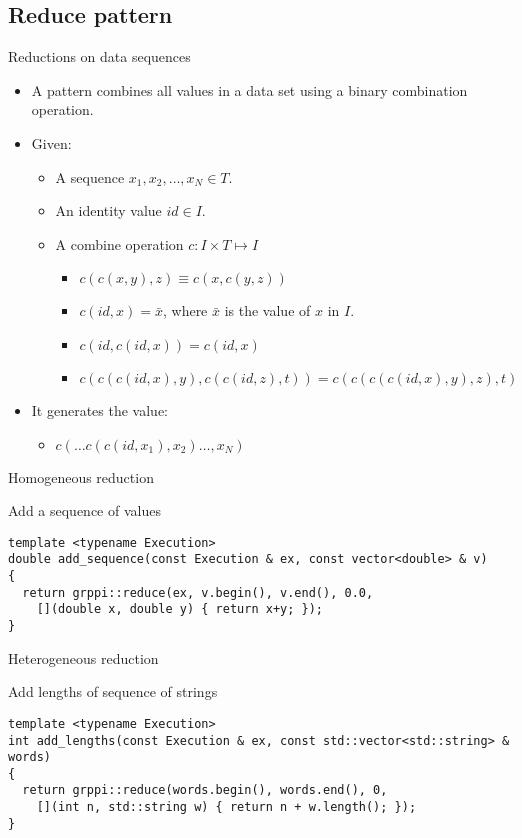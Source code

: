 \subsection{Reduce pattern}

\begin{frame}[t]{Reductions on data sequences}
\begin{itemize}
  \item A  pattern combines all values in a data set
        using a binary combination operation.
  \vfill
  \item Given:
    \begin{itemize}
      \item A sequence $x_1, x_2, \ldots, x_N \in T$.
      \item An identity value $id \in I$.
      \item A combine operation $c : I \times T \mapsto I$
        \begin{itemize}
          \item $c(c(x,y),z) \equiv c(x,c(y,z))$
          \item $c(id,x) = \bar{x}$, where $\bar{x}$ is the value of $x$ in $I$.
          \item $c(id,c(id,x)) = c(id,x)$
          \item $c(c(c(id,x),y),c(c(id,z),t)) = c(c(c(c(id,x),y),z),t)$
        \end{itemize}
    \end{itemize}
  \vfill
  \item It generates the value:
    \begin{itemize}
      \item $c(\ldots c(c(id,x_1), x_2) \ldots, x_N)$
    \end{itemize}
\end{itemize}
\end{frame}

\begin{frame}[t,fragile]{Homogeneous reduction}
\begin{block}{Add a sequence of values}
\begin{lstlisting}
template <typename Execution>
double add_sequence(const Execution & ex, const vector<double> & v)
{
  return grppi::reduce(ex, v.begin(), v.end(), 0.0,
    [](double x, double y) { return x+y; });
}
\end{lstlisting}
\end{block}
\end{frame}

\begin{frame}[t,fragile]{Heterogeneous reduction}
\begin{block}{Add lengths of sequence of strings}
\begin{lstlisting}
template <typename Execution>
int add_lengths(const Execution & ex, const std::vector<std::string> & words)
{
  return grppi::reduce(words.begin(), words.end(), 0,
    [](int n, std::string w) { return n + w.length(); });
}
\end{lstlisting}
\end{block}
\end{frame}
